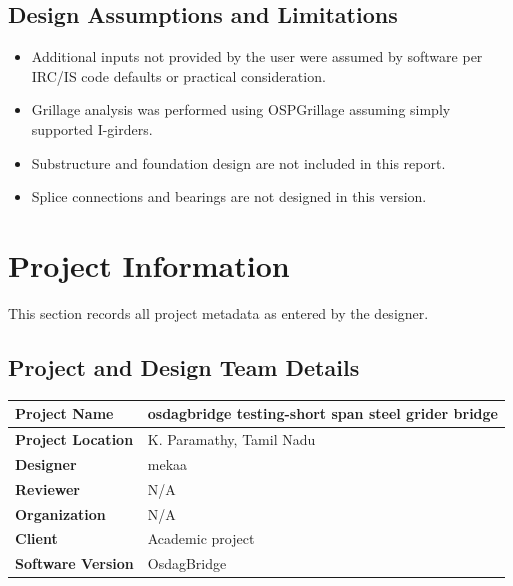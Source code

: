 \documentclass[12pt,a4paper]{report}
\numberwithin{table}{chapter}
\numberwithin{figure}{chapter}
\begin{document}
\section*{Design Assumptions and Limitations}
\label{sec:assumptions}

\begin{itemize}
\item Additional inputs not provided by the user were assumed by software per IRC/IS code defaults or practical consideration.
\item Grillage analysis was performed using OSPGrillage assuming simply supported I-girders.
\item Substructure and foundation design are not included in this report.
\item Splice connections and bearings are not designed in this version.
\end{itemize}

\titleformat{\chapter}[block]{\normalfont\Large\bfseries\centering}{\thechapter}{1em}{}
\titlespacing*{\chapter}{0pt}{-30pt}{10pt}


\chapter{Project Information}

This section records all project metadata as entered by the designer.

\section{Project and Design Team Details}
\label{sec:project-details}

\begin{tabular}{|L{5.5cm}|L{8.5cm}|}
\hline
\textbf{Project Name} & osdagbridge testing-short span steel grider bridge \\
\hline
\textbf{Project Location} & K. Paramathy, Tamil Nadu \\
\hline
\textbf{Designer} & mekaa \\
\hline
\textbf{Reviewer} & N/A \\
\hline
\textbf{Organization} & N/A \\
\hline
\textbf{Client} & Academic project \\
\hline
\textbf{Software Version} & OsdagBridge \\
\hline
\end{tabular}
\end{document}
